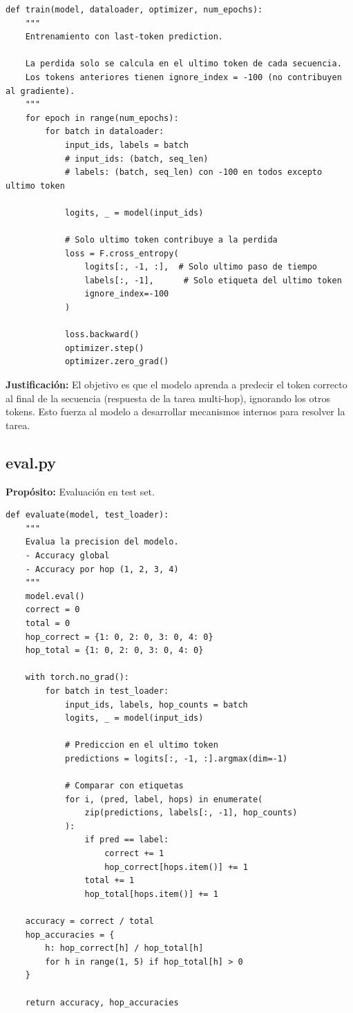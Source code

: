 \documentclass[12pt,a4paper]{report}
\begin{document}
\begin{lstlisting}
def train(model, dataloader, optimizer, num_epochs):
    """
    Entrenamiento con last-token prediction.
    
    La perdida solo se calcula en el ultimo token de cada secuencia.
    Los tokens anteriores tienen ignore_index = -100 (no contribuyen al gradiente).
    """
    for epoch in range(num_epochs):
        for batch in dataloader:
            input_ids, labels = batch
            # input_ids: (batch, seq_len)
            # labels: (batch, seq_len) con -100 en todos excepto ultimo token

            logits, _ = model(input_ids)

            # Solo ultimo token contribuye a la perdida
            loss = F.cross_entropy(
                logits[:, -1, :],  # Solo ultimo paso de tiempo
                labels[:, -1],      # Solo etiqueta del ultimo token
                ignore_index=-100
            )

            loss.backward()
            optimizer.step()
            optimizer.zero_grad()
\end{lstlisting}

\textbf{Justificación:} El objetivo es que el modelo aprenda a predecir el token correcto al final de la secuencia (respuesta de la tarea multi-hop), ignorando los otros tokens. Esto fuerza al modelo a desarrollar mecanismos internos para resolver la tarea.

\subsection{eval.py}
\label{subsec:eval}

\textbf{Propósito:} Evaluación en test set.

\begin{lstlisting}
def evaluate(model, test_loader):
    """
    Evalua la precision del modelo.
    - Accuracy global
    - Accuracy por hop (1, 2, 3, 4)
    """
    model.eval()
    correct = 0
    total = 0
    hop_correct = {1: 0, 2: 0, 3: 0, 4: 0}
    hop_total = {1: 0, 2: 0, 3: 0, 4: 0}
    
    with torch.no_grad():
        for batch in test_loader:
            input_ids, labels, hop_counts = batch
            logits, _ = model(input_ids)

            # Prediccion en el ultimo token
            predictions = logits[:, -1, :].argmax(dim=-1)

            # Comparar con etiquetas
            for i, (pred, label, hops) in enumerate(
                zip(predictions, labels[:, -1], hop_counts)
            ):
                if pred == label:
                    correct += 1
                    hop_correct[hops.item()] += 1
                total += 1
                hop_total[hops.item()] += 1
    
    accuracy = correct / total
    hop_accuracies = {
        h: hop_correct[h] / hop_total[h] 
        for h in range(1, 5) if hop_total[h] > 0
    }
    
    return accuracy, hop_accuracies
\end{lstlisting}
\end{document}
